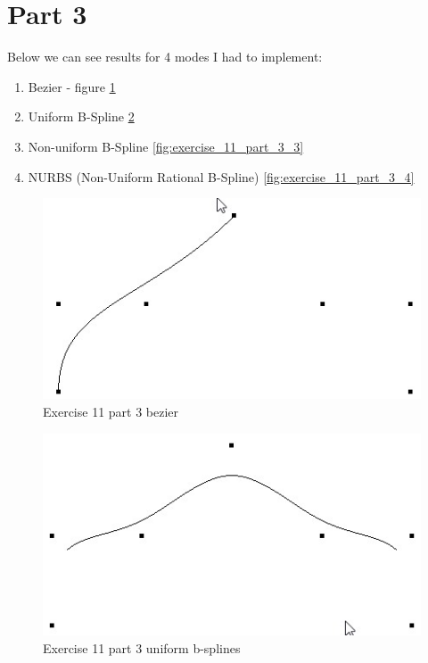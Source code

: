 \section{Part 3}
Below we can see results for 4 modes I had to implement:
\begin{enumerate}
\item Bezier - figure \ref{fig:exercise_11_part_3_1}
\item Uniform B-Spline \ref{fig:exercise_11_part_3_2}
\item Non-uniform B-Spline \ref{fig:exercise_11_part_3_3}
\item NURBS (Non-Uniform Rational B-Spline) \ref{fig:exercise_11_part_3_4}
\end{enumerate}
\begin{figure}[ht!]
	\begin{center}
		\includegraphics[width=1.0\textwidth]{figures/exercise_11_part_3_1}
	\end{center}
	\vspace{-4.5ex}\caption{Exercise 11 part 3 bezier}
	\label{fig:exercise_11_part_3_1} 
\end{figure}
\begin{figure}[ht!]
	\begin{center}
		\includegraphics[width=1.0\textwidth]{figures/exercise_11_part_3_2}
	\end{center}
	\vspace{-4.5ex}\caption{Exercise 11 part 3 uniform b-splines}
	\label{fig:exercise_11_part_3_2} 
\end{figure}

